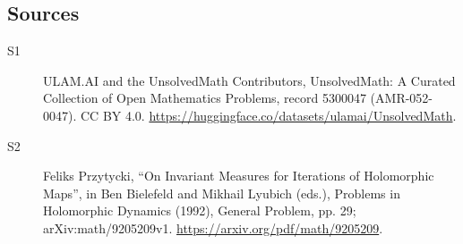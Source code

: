 \documentclass[11pt]{article}
\begin{document}
\subsection{Sources}
\begin{description}
\item[\hypertarget{source:5300047:1}{S1}] ULAM.AI and the UnsolvedMath Contributors, UnsolvedMath: A Curated Collection of Open Mathematics Problems, record 5300047 (AMR-052-0047). CC BY 4.0. \url{https://huggingface.co/datasets/ulamai/UnsolvedMath}.
\item[\hypertarget{source:5300047:2}{S2}] Feliks Przytycki, ``On Invariant Measures for Iterations of Holomorphic Maps'', in Ben Bielefeld and Mikhail Lyubich (eds.), Problems in Holomorphic Dynamics (1992), General Problem, pp. 29; arXiv:math/9205209v1. \url{https://arxiv.org/pdf/math/9205209}.
\end{description}
\label{end:5300047}
\end{document}
